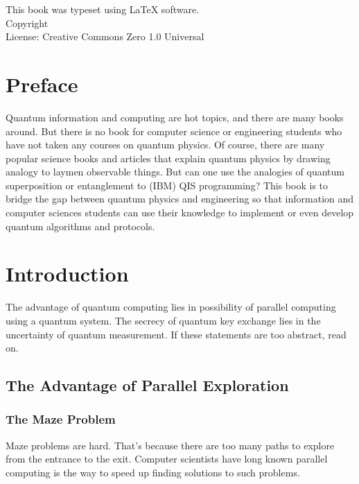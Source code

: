 \documentclass{book}
\makeatletter
\newcommand{\booklicense}{Creative Commons Zero 1.0 Universal}
\newcommand{\bookauthor}{\@author}
\makeatother
\begin{document}
\thispagestyle{empty}

\begin{flushleft}
\vspace*{\fill}
This book was typeset using \LaTeX{} software.\\
\vspace{\fill}
Copyright \textcopyright{} \the\year{}  \bookauthor\\
License: \booklicense
\end{flushleft}

\addtocounter{page}{2}

\chapter*{Preface}
Quantum information and computing are hot topics, and there are many books around. But there is no book for computer science or engineering students who have not taken any courses on quantum physics. Of course, there are many popular science books and articles that explain quantum physics by drawing analogy to laymen observable things. But can one use the analogies of quantum superposition or entanglement to (IBM) QIS programming? This book is to bridge the gap between quantum physics and engineering so that information and computer sciences students can use their knowledge to implement or even develop quantum algorithms and protocols.

\setcounter{tocdepth}{3}
\tableofcontents

\mainmatter

\chapter{Introduction}
The advantage of quantum computing lies in possibility of parallel computing using a quantum system. The secrecy of quantum key exchange lies in the uncertainty of quantum measurement. If these statements are too abstract, read on.

\section{The Advantage of Parallel Exploration}
\subsection{The Maze Problem}
Maze problems are hard. That's because there are too many paths to explore from the entrance to the exit. Computer scientists have long known parallel computing is the way to speed up finding solutions to such problems.
\end{document}
